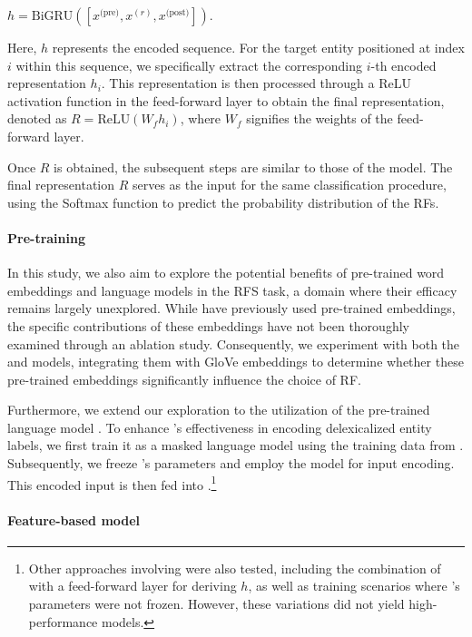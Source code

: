 \ea$
	h = \mbox{BiGRU}([x^{\text{(pre)}}, x^{(r)}, x^{\text{(post)}}]).
$\z

Here, $h$ represents the encoded sequence. For the target entity positioned at index $i$ within this sequence, we specifically extract the corresponding $i$-th encoded representation $h_i$. This representation is then processed through a ReLU activation function in the feed-forward layer to obtain the final representation, denoted as $R = \mbox{ReLU}(W_f h_i)$, where $W_f$ signifies the weights of the feed-forward layer.

Once $R$ is obtained, the subsequent steps are similar to those of the  model. The final representation $R$ serves as the input for the same classification procedure, using the Softmax function to predict the probability distribution of the RFs.

\paragraph*{Pre-training}
In this study, we also aim to explore the potential benefits of pre-trained word embeddings and language models in the RFS task, a domain where their efficacy remains largely unexplored. While \citet{cao2019referring} have previously used pre-trained embeddings, the specific contributions of these embeddings have not been thoroughly examined through an ablation study. Consequently, we experiment with both the  and  models, integrating them with GloVe embeddings \citep{pennington-etal-2014-glove} to determine whether these pre-trained embeddings significantly influence the choice of RF.

Furthermore, we extend our exploration to the utilization of the pre-trained language model \bert \citep{devlin-etal-2019-bert}. To enhance \bert's effectiveness in encoding delexicalized entity labels, we first train it as a masked language model using the training data from \webnlg. Subsequently, we freeze \bert's parameters and employ the model for input encoding. This encoded input is then fed into .\footnote{Other approaches involving \bert were also tested, including the combination of \bert with a feed-forward layer for deriving $h$, as well as training scenarios where \bert's parameters were not frozen. However, these variations did not yield high-performance models.}

\paragraph*{Feature-based model}

